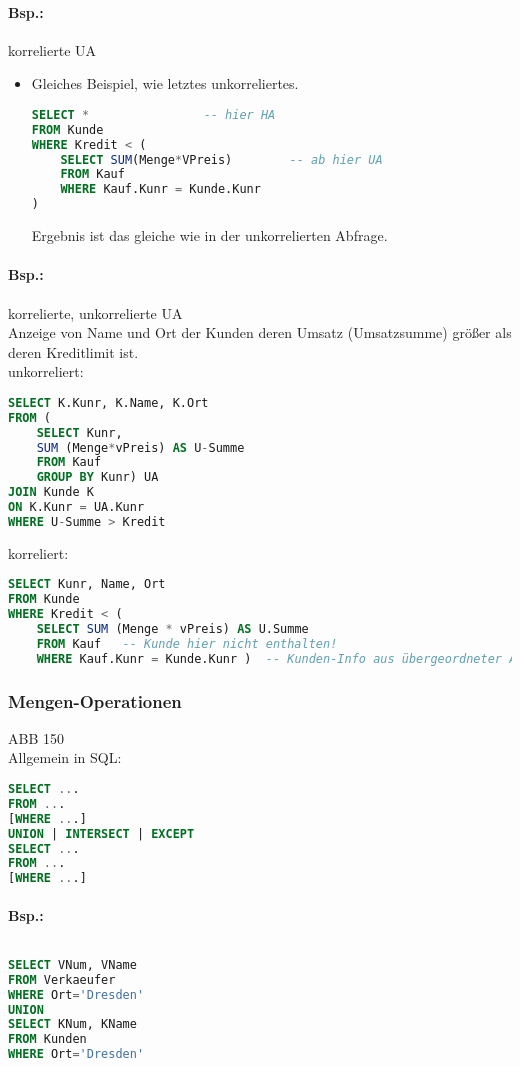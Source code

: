 \paragraph{Bsp.:} korrelierte UA
\begin{itemize}
\item Gleiches Beispiel, wie letztes unkorreliertes.
\begin{lstlisting}[language=SQL]
SELECT * 				-- hier HA
FROM Kunde 
WHERE Kredit < (
	SELECT SUM(Menge*VPreis)		-- ab hier UA
	FROM Kauf
	WHERE Kauf.Kunr = Kunde.Kunr
)
\end{lstlisting}
Ergebnis ist das gleiche wie in der unkorrelierten Abfrage.
\end{itemize}

\paragraph{Bsp.:} korrelierte, unkorrelierte UA\\
Anzeige von Name und Ort der Kunden deren Umsatz (Umsatzsumme) größer als deren Kreditlimit ist.\\
unkorreliert:
\begin{lstlisting}[language=SQL]
SELECT K.Kunr, K.Name, K.Ort
FROM (
	SELECT Kunr,
	SUM (Menge*vPreis) AS U-Summe
	FROM Kauf
	GROUP BY Kunr) UA
JOIN Kunde K
ON K.Kunr = UA.Kunr
WHERE U-Summe > Kredit
\end{lstlisting}
korreliert:
\begin{lstlisting}[language=SQL]
SELECT Kunr, Name, Ort
FROM Kunde
WHERE Kredit < (
	SELECT SUM (Menge * vPreis) AS U.Summe
	FROM Kauf	-- Kunde hier nicht enthalten!
	WHERE Kauf.Kunr = Kunde.Kunr )	-- Kunden-Info aus übergeordneter Abfrage
\end{lstlisting}

\subsubsection{Mengen-Operationen}
ABB 150\\
Allgemein in SQL:
\begin{lstlisting}[language=SQL]
SELECT ...
FROM ...
[WHERE ...]
UNION | INTERSECT | EXCEPT
SELECT ...
FROM ...
[WHERE ...]
\end{lstlisting}
\paragraph{Bsp.:}$ $
\begin{lstlisting}[language=SQL]
SELECT VNum, VName
FROM Verkaeufer
WHERE Ort='Dresden'
UNION
SELECT KNum, KName
FROM Kunden
WHERE Ort='Dresden'
\end{lstlisting}

